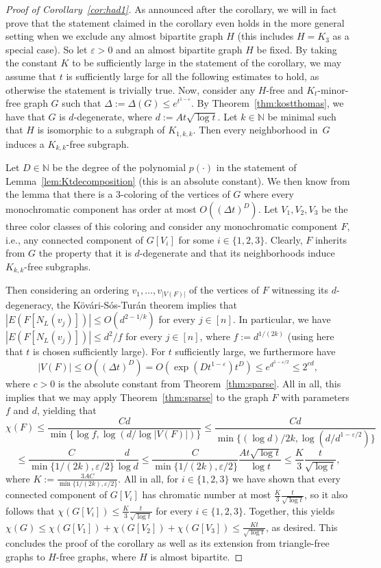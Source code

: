 \documentclass[10pt]{amsart}
\theoremstyle{definition}
\begin{document}
    \begin{proof}[Proof of Corollary~\ref{cor:had1}]
As announced after the corollary, we will in fact prove that the statement claimed in the corollary even holds in the more general setting when we exclude any almost bipartite graph $H$ (this includes $H=K_3$ as a special case). So let $\varepsilon>0$ and an almost bipartite graph $H$ be fixed. By taking the constant $K$ to be sufficiently large in the statement of the corollary, we may assume that $t$ is sufficiently large for all the following estimates to hold, as otherwise the statement is trivially true. Now, consider any $H$-free and $K_t$-minor-free graph $G$ such that $\Delta:=\Delta(G)\le e^{t^{1-\varepsilon}}$. By Theorem~\ref{thm:kostthomas}, we have that $G$ is $d$-degenerate, where $d:= At\sqrt{\log t}$. Let $k\in \mathbb{N}$ be minimal such that $H$ is isomorphic to a subgraph of $K_{1,k,k}$. Then every neighborhood in~$G$ induces a $K_{k,k}$-free subgraph. 

Let $D\in\mathbb{N}$ be the degree of the polynomial $p(\cdot)$ in the statement of Lemma~\ref{lem:Ktdecomposition} (this is an absolute constant). We then know from the lemma that there is a $3$-coloring of the vertices of $G$ where every monochromatic component has order at most $O((\Delta t)^D).$ Let $V_1,V_2,V_3$ be the three color classes of this coloring and consider any monochromatic component $F$, i.e., any connected component of $G[V_i]$ for some $i\in \{1,2,3\}$. Clearly, $F$ inherits from $G$ the property that it is $d$-degenerate and that its neighborhoods induce $K_{k,k}$-free subgraphs.

Then considering an ordering $v_1,\ldots,v_{|V(F)|}$ of the vertices of $F$ witnessing its $d$-degeneracy, the K\"{o}v\'{a}ri-S\'{o}s-Tur\'{a}n theorem implies that $|E(F[N_L(v_j)])|\le O(d^{2-1/k})$ for every $j\in [n]$. In particular, we have $|E(F[N_L(v_j)])|\le d^2/f$ for every $j\in [n]$, where $f:=d^{1/(2k)}$ (using here that $t$ is chosen sufficiently large). For $t$ sufficiently large, we furthermore have 
$$|V(F)|\le O((\Delta t)^D)= O(\exp(Dt^{1-\varepsilon})t^D)\le e^{d^{1-\varepsilon/2}}\le 2^{cd},$$ where $c>0$ is the absolute constant from Theorem~\ref{thm:sparse}. All in all, this implies that we may apply Theorem~\ref{thm:sparse} to the graph $F$ with parameters $f$ and $d$, yielding that
$$\chi(F)\le \frac{C d}{\min\{\log  f,\log(d/\log |V(F)|)\}}\le \frac{Cd}{\min\{(\log d)/2k,\log(d/d^{1-\varepsilon/2})\}}$$ $$\le \frac{C}{\min\{1/(2k),\varepsilon/2\}}\frac{d}{\log d}\le \frac{C}{\min\{1/(2k),\varepsilon/2\}}\frac{At\sqrt{\log t}}{\log t}\le \frac{K}{3}\frac{t}{\sqrt{\log t}},$$ where $K:=\frac{3AC}{\min\{1/(2k),\varepsilon/2\}}$. All in all, for $i\in \{1,2,3\}$ we have shown that every connected component of $G[V_i]$ has chromatic number at most $\frac{K}{3}\frac{t}{\sqrt{\log t}}$, so it also follows that $\chi(G[V_i])\le \frac{K}{3}\frac{t}{\sqrt{\log t}}$ for every $i\in \{1,2,3\}$. 
Together, this yields
$\chi(G)\le \chi(G[V_1])+\chi(G[V_2])+\chi(G[V_3])\le \frac{Kt}{\sqrt{\log t}}$, as desired. This concludes the proof of the corollary as well as its extension from triangle-free graphs to $H$-free graphs, where $H$ is almost bipartite.
  
    \end{proof}
\end{document}
